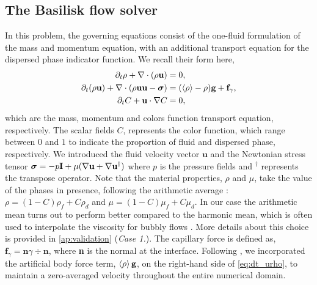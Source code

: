 \subsection{The Basilisk flow solver}

In this problem, the governing equations consist of the one-fluid formulation of the mass and momentum equation, with an additional transport equation for the dispersed phase indicator function. 
We recall their form here, 
\begin{align}
    \partial_t \rho+ \mathbf{\nabla}\cdot(\rho\textbf{u})
    &= 0,\\
    \label{eq:dt_urho}
    \partial_t (\rho \textbf{u})
    + \mathbf{\nabla}\cdot (\rho  \textbf{u} \textbf{u} - \bm\sigma)
    &= (\left<\rho\right> - \rho)\textbf{g}
    + \textbf{f}_\gamma,\\
    \label{eq:dt_C}
    \partial_t C + \textbf{u}\cdot\mathbf{\nabla} C  
    &= 0,
\end{align}
which are the mass, momentum and colors function transport equation, respectively. 
The scalar fields $C$, represents the color function, which range between $0$ and $1$ to indicate the proportion of fluid and dispersed phase, respectively. 
We introduced the fluid velocity vector $\textbf{u}$ and the Newtonian stress tensor $\bm{\sigma} = -p \textbf{I} + \mu (\mathbf{\nabla} \textbf{u}+ \mathbf{\nabla} \textbf{u}^\dagger)$ where $p$ is the pressure fields and $^\dagger$ represents the transpose operator.
Note that the material properties, $\rho$ and $\mu$, take the value of the phases in presence, following the arithmetic average : $\rho = (1-C)\rho_f + C \rho_d$ and $\mu = (1-C)\mu_f + C \mu_d$. 
In our case the arithmetic mean turns out to perform better compared to the harmonic mean, which is often used to interpolate the viscosity for bubbly flows \citet{hidman2023assessing,innocenti2020direct}.
More details about this choice is provided in \ref{ap:validation} (\textit{Case 1.}). 
The capillary force is defined as, $\textbf{f}_\gamma =\textbf{n} \gamma \div \textbf{n} $, where \textbf{n} is the normal at the interface.
Following  \citep{bunner2002dynamics}, we incorporated the artificial body force term, $\left<\rho\right>\textbf{g}$, on the right-hand side of \ref{eq:dt_urho}, to maintain a zero-averaged velocity throughout the entire numerical domain.  

